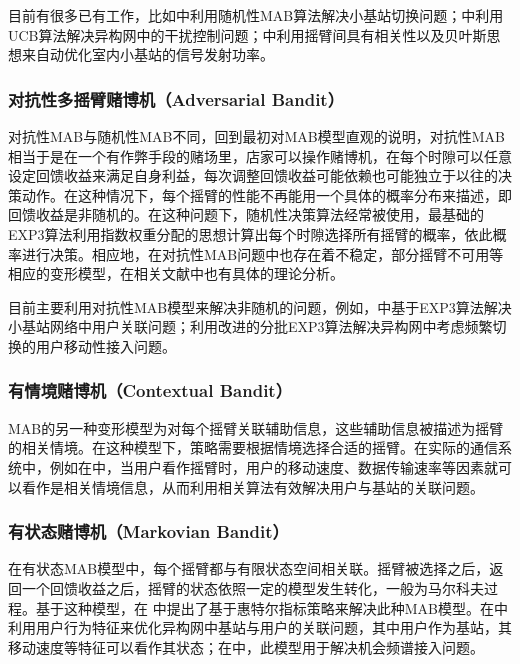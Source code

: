 ﻿\documentclass[11pt,draftclsnofoot,onecolumn,journal,letterpaper]{IEEEtran}
\begin{document}
目前有很多已有工作，比如\cite{Shen2017}中利用随机性MAB算法解决小基站切换问题；\cite{Simsek2015a}中利用UCB算法解决异构网中的干扰控制问题；\cite{Wang2017}中利用摇臂间具有相关性以及贝叶斯思想来自动优化室内小基站的信号发射功率。

\subsubsection{对抗性多摇臂赌博机（Adversarial Bandit）}
对抗性MAB与随机性MAB不同，回到最初对MAB模型直观的说明，对抗性MAB相当于是在一个有作弊手段的赌场里，店家可以操作赌博机，在每个时隙可以任意设定回馈收益来满足自身利益，每次调整回馈收益可能依赖也可能独立于以往的决策动作。在这种情况下，每个摇臂的性能不再能用一个具体的概率分布来描述，即回馈收益是非随机的。在这种问题下，随机性决策算法经常被使用，最基础的EXP3算法\cite{Auer2002}利用指数权重分配的思想计算出每个时隙选择所有摇臂的概率，依此概率进行决策。相应地，在对抗性MAB问题中也存在着不稳定，部分摇臂不可用等相应的变形模型，在相关文献中也有具体的理论分析。

目前主要利用对抗性MAB模型来解决非随机的问题，例如，\cite{Maghsudi2017}中基于EXP3算法解决小基站网络中用户关联问题；\cite{Shen2016}利用改进的分批EXP3算法解决异构网中考虑频繁切换的用户移动性接入问题。

\subsubsection{有情境赌博机（Contextual Bandit）}
MAB的另一种变形模型为对每个摇臂关联辅助信息，这些辅助信息被描述为摇臂的相关情境。在这种模型下，策略需要根据情境选择合适的摇臂。在实际的通信系统中，例如在\cite{Simsek2015a}中，当用户看作摇臂时，用户的移动速度、数据传输速率等因素就可以看作是相关情境信息，从而利用相关算法有效解决用户与基站的关联问题。



\subsubsection{有状态赌博机（Markovian Bandit）}
在有状态MAB模型中，每个摇臂都与有限状态空间相关联。摇臂被选择之后，返回一个回馈收益之后，摇臂的状态依照一定的模型发生转化，一般为马尔科夫过程。基于这种模型，在 中提出了基于惠特尔指标策略来解决此种MAB模型。在\cite{Sun2017}中利用用户行为特征来优化异构网中基站与用户的关联问题，其中用户作为基站，其移动速度等特征可以看作其状态；在\cite{Tekin2011}中，此模型用于解决机会频谱接入问题。

\end{document}
